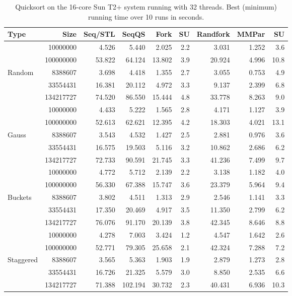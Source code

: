 \documentclass[preprint]{sigplanconf}
\begin{document}
\begin{table*}[t!]
\begin{center}
\begin{tabular}{|lr|rr|rrr||rr|}
\hline
Type & Size & Seq/STL & SeqQS & Fork & SU & Randfork & MMPar & SU \\
\hline
 & 10000000 & 4.526 & 5.440 & 2.025 & 2.2 & 3.031 & 1.252 & 3.6 \\
 & 100000000 & 53.822 & 64.124 & 13.802 & 3.9 & 20.924 & 4.996 & 10.8 \\
Random & 8388607 & 3.698 & 4.418 & 1.355 & 2.7 & 3.055 & 0.753 & 4.9 \\
 & 33554431 & 16.381 & 20.112 & 4.972 & 3.3 & 9.137 & 2.399 & 6.8 \\
 & 134217727 & 74.520 & 86.550 & 15.444 & 4.8 & 33.778 & 8.263 & 9.0 \\
\hline
 & 10000000 & 4.433 & 5.222 & 1.565 & 2.8 & 4.171 & 1.127 & 3.9 \\
 & 100000000 & 52.613 & 62.621 & 12.395 & 4.2 & 18.303 & 4.021 & 13.1 \\
Gauss & 8388607 & 3.543 & 4.532 & 1.427 & 2.5 & 2.881 & 0.976 & 3.6 \\
 & 33554431 & 16.575 & 19.503 & 5.116 & 3.2 & 10.862 & 2.686 & 6.2 \\
 & 134217727 & 72.733 & 90.591 & 21.745 & 3.3 & 41.236 & 7.499 & 9.7 \\
\hline
 & 10000000 & 4.772 & 5.712 & 2.139 & 2.2 & 3.138 & 1.182 & 4.0 \\
 & 100000000 & 56.330 & 67.388 & 15.747 & 3.6 & 23.379 & 5.964 & 9.4 \\
Buckets & 8388607 & 3.802 & 4.511 & 1.313 & 2.9 & 2.546 & 1.141 & 3.3 \\
 & 33554431 & 17.350 & 20.469 & 4.917 & 3.5 & 11.350 & 2.799 & 6.2 \\
 & 134217727 & 76.076 & 91.170 & 20.139 & 3.8 & 42.345 & 8.646 & 8.8 \\
\hline
 & 10000000 & 4.278 & 7.003 & 3.424 & 1.2 & 4.547 & 1.642 & 2.6 \\
 & 100000000 & 52.771 & 79.305 & 25.658 & 2.1 & 42.324 & 7.288 & 7.2 \\
Staggered & 8388607 & 3.565 & 5.363 & 1.903 & 1.9 & 2.879 & 1.273 & 2.8 \\
 & 33554431 & 16.726 & 21.325 & 5.579 & 3.0 & 8.850 & 2.535 & 6.6 \\
 & 134217727 & 71.388 & 102.194 & 30.732 & 2.3 & 40.431 & 6.936 & 10.3 \\
\hline
\end{tabular}
\end{center}
\caption{Quicksort on the 16-core Sun T2+ system running with 32 threads. 
Best (minimum) running time over 10 runs in seconds.}
\label{tab:sort_t2_32_min}
\end{table*}
\end{document}
